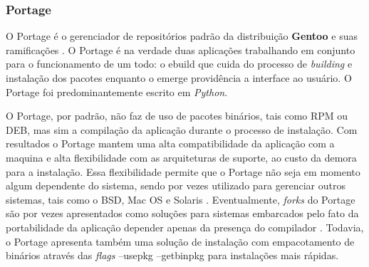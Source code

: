\subsubsection{Portage} %
\label{ssub:emerge}

O Portage é  o gerenciador de repositórios padrão da distribuição \textbf{Gentoo} e suas ramificações \cite{vermeulen2005gentoo}. O Portage é na verdade duas aplicações trabalhando em conjunto para o funcionamento de um todo: o {\code ebuild} que cuida do processo de \textit{building} e instalação dos pacotes enquanto o {\code emerge} providência a interface ao usuário. O Portage foi predominantemente escrito em \textit{Python}.

O Portage, por padrão, não faz de uso de pacotes binários, tais como RPM ou DEB, mas sim a compilação da aplicação durante o processo de instalação. Com resultados o Portage mantem uma alta compatibilidade da aplicação com a maquina e alta flexibilidade com as arquiteturas de suporte, ao custo da demora para a instalação.
Essa flexibilidade permite que o Portage não seja em momento algum dependente do sistema, sendo por vezes utilizado para gerenciar outros sistemas, tais como o BSD, Mac OS e Solaris \cite{ryan2010linux}.
Eventualmente, \textit{forks} do Portage são por vezes apresentados como soluções para sistemas embarcados pelo fato da portabilidade da aplicação depender apenas da presença do compilador \cite{guointegrated}. Todavia, o Portage apresenta também uma solução de instalação com empacotamento de binários através das \textit{flags} {\code --usepkg --getbinpkg} \cite{gentoo-doc}  para instalações mais rápidas.